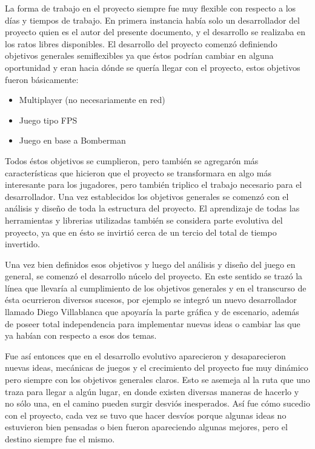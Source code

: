 \documentclass[a4paper,12pt,openany,oneside]{book}
\begin{document}
La forma de trabajo en el proyecto siempre fue muy flexible con respecto a los días y tiempos de trabajo. En primera instancia había solo un desarrollador del proyecto quien es el autor del presente documento, y el desarrollo se realizaba en los ratos libres disponibles.
El desarrollo del proyecto comenzó definiendo objetivos generales semiflexibles ya que éstos podrían cambiar en alguna oportunidad y eran hacia dónde se quería llegar con el proyecto, estos objetivos fueron básicamente:
\begin{itemize}
\item Multiplayer (no necesariamente en red)
\item Juego tipo FPS
\item Juego en base a Bomberman
\end{itemize}
Todos éstos objetivos se cumplieron, pero también se agregarón más características que hicieron que el proyecto se transformara en algo más interesante para los jugadores, pero también triplico el trabajo necesario para el desarrollador. Una vez establecidos los objetivos generales se comenzó con el análisis y diseño de toda la estructura del proyecto. El aprendizaje de todas las herramientas y librerias utilizadas también se considera parte evolutiva del proyecto, ya que en ésto se invirtió cerca de un tercio del total de tiempo invertido.

Una vez bien definidos esos objetivos y luego del análisis y diseño del juego en general, se comenzó el desarrollo núcelo del proyecto. En este sentido se trazó la línea que llevaría al cumplimiento de los objetivos generales y en el transcurso de ésta ocurrieron diversos sucesos, por ejemplo se integró un nuevo desarrollador llamado Diego Villablanca que apoyaría la parte gráfica y de escenario, además de poseer total independencia para implementar nuevas ideas o cambiar las que ya habían con respecto a esos dos temas.

Fue así entonces que en el desarrollo evolutivo aparecieron y desaparecieron nuevas ideas, mecánicas de juegos y el crecimiento del proyecto fue muy dinámico pero siempre con los objetivos generales claros. Esto se asemeja al la ruta que uno traza para llegar a algún lugar, en donde existen diversas maneras de hacerlo y no sólo una, en el camino pueden surgir desviós inesperados. Así fue cómo sucedio con el proyecto, cada vez se tuvo que hacer desvíos porque algunas ideas no estuvieron bien pensadas o bien fueron apareciendo algunas mejores, pero el destino siempre fue el mismo.
\end{document}
